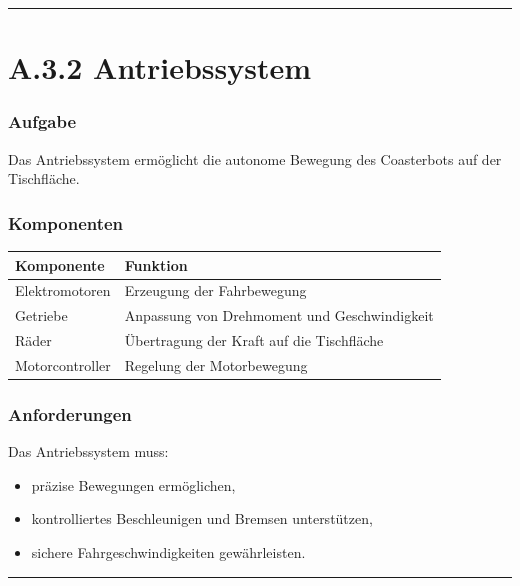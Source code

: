\documentclass[
  a4paper,
  12pt,
  DIV=12,        %
  parskip=half,  %
  headings=small %
]{scrartcl}
\theoremstyle{definition}
\providecommand{\tightlist}{%
  \setlength{\itemsep}{0pt}\setlength{\parskip}{0pt}}
\theoremstyle{definition}
\providecommand{\tightlist}{%
  \setlength{\itemsep}{0pt}\setlength{\parskip}{0pt}}
\begin{document}
\begin{center}\rule{0.5\linewidth}{0.5pt}\end{center}

\section{A.3.2 Antriebssystem}\label{a.3.2-antriebssystem}

\subsubsection{Aufgabe}\label{aufgabe-1}

Das Antriebssystem ermöglicht die autonome Bewegung des Coasterbots auf
der Tischfläche.

\subsubsection{Komponenten}\label{komponenten}

\begin{longtable}[]{@{}ll@{}}
\toprule\noalign{}
Komponente & Funktion \\
\midrule\noalign{}
\endhead
\bottomrule\noalign{}
\endlastfoot
Elektromotoren & Erzeugung der Fahrbewegung \\
Getriebe & Anpassung von Drehmoment und Geschwindigkeit \\
Räder & Übertragung der Kraft auf die Tischfläche \\
Motorcontroller & Regelung der Motorbewegung \\
\end{longtable}

\subsubsection{Anforderungen}\label{anforderungen-1}

Das Antriebssystem muss:

\begin{itemize}
\tightlist
\item
  präzise Bewegungen ermöglichen,
\item
  kontrolliertes Beschleunigen und Bremsen unterstützen,
\item
  sichere Fahrgeschwindigkeiten gewährleisten.
\end{itemize}

\begin{center}\rule{0.5\linewidth}{0.5pt}\end{center}
\end{document}
